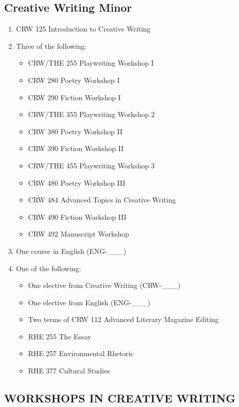 \documentclass[
  letterpaper,
]{scrbook}
\providecommand{\tightlist}{%
  \setlength{\itemsep}{0pt}\setlength{\parskip}{0pt}}
\begin{document}
\subsection{Creative Writing Minor}\label{creative-writing-minor}

\begin{enumerate}
\def\labelenumi{\arabic{enumi}.}
\tightlist
\item
  CRW 125 Introduction to Creative Writing
\item
  Three of the following:

  \begin{itemize}
  \tightlist
  \item
    CRW/THE 255 Playwriting Workshop I
  \item
    CRW 280 Poetry Workshop I
  \item
    CRW 290 Fiction Workshop I
  \item
    CRW/THE 355 Playwriting Workshop 2
  \item
    CRW 380 Poetry Workshop II
  \item
    CRW 390 Fiction Workshop II
  \item
    CRW/THE 455 Playwriting Workshop 3
  \item
    CRW 480 Poetry Workshop III
  \item
    CRW 484 Advanced Topics in Creative Writing
  \item
    CRW 490 Fiction Workshop III
  \item
    CRW 492 Manuscript Workshop
  \end{itemize}
\item
  One course in English (ENG-\_\_\_)
\item
  One of the following:

  \begin{itemize}
  \tightlist
  \item
    One elective from Creative Writing (CRW-\_\_\_)
  \item
    One elective from English (ENG-\_\_\_)
  \item
    Two terms of CRW 112 Advanced Literary Magazine Editing
  \item
    RHE 255 The Essay
  \item
    RHE 257 Environmental Rhetoric
  \item
    RHE 377 Cultural Studies
  \end{itemize}
\end{enumerate}

\subsection{WORKSHOPS IN CREATIVE
WRITING}\label{workshops-in-creative-writing}
\end{document}
